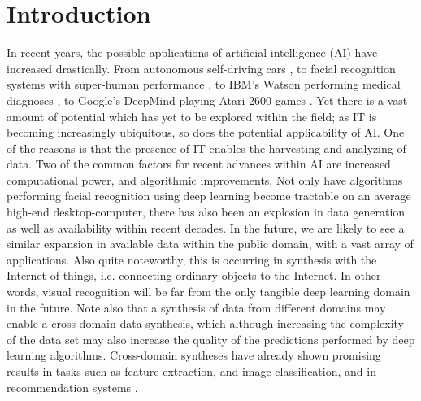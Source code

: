 
\chapter{Introduction}\label{chpt:intro}

In recent years, the possible applications of artificial intelligence (AI) have increased drastically. From autonomous self-driving cars \citep{Urmson2009}, to facial recognition systems with super-human performance \citep{Sun2014}, to IBM's Watson performing medical diagnoses \citep{Wagle2013}, to Google's DeepMind playing Atari 2600 games \citep{Mnih2015}. Yet there is a vast amount of potential which has yet to be explored within the field; as IT is becoming increasingly ubiquitous, so does the potential applicability of AI. One of the reasons is that the presence of IT enables the harvesting and analyzing of data. Two of the common factors for recent advances within AI are increased computational power, and algorithmic improvements. Not only have algorithms performing facial recognition using deep learning become tractable on an average high-end desktop-computer, there has also been an explosion in data generation as well as availability within recent decades. In the future, we are likely to see a similar expansion in available data within the public domain, with a vast array of applications. Also quite noteworthy, this is occurring in synthesis with the Internet of things, i.e. connecting ordinary objects to the Internet. In other words, visual recognition will be far from the only tangible deep learning domain in the future.
Note also that a synthesis of data from different domains may enable a cross-domain data synthesis, which although increasing the complexity of the data set may also increase the quality of the predictions performed by deep learning algorithms.
Cross-domain syntheses have already shown promising results in tasks such as feature extraction, and image classification, and in recommendation systems \citep{Huang2013, Shapira2013}.
\\

